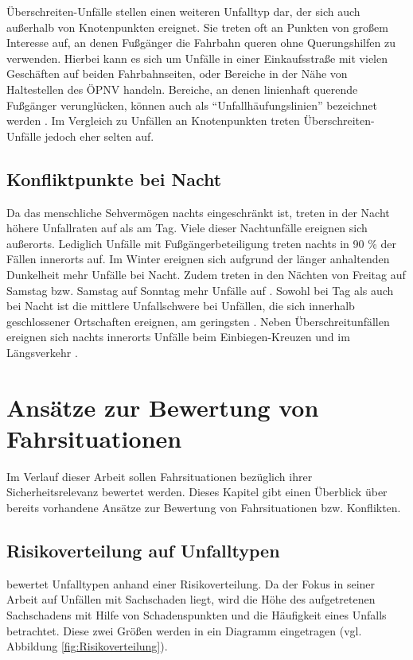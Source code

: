 Überschreiten-Unfälle stellen einen weiteren Unfalltyp dar, der sich auch außerhalb von Knotenpunkten ereignet. Sie treten oft an Punkten von großem Interesse auf, an denen Fußgänger die Fahrbahn queren ohne Querungshilfen zu verwenden. Hierbei kann es sich um Unfälle in einer Einkaufsstraße mit vielen Geschäften auf beiden Fahrbahnseiten, oder Bereiche in der Nähe von Haltestellen des \ac{ÖPNV} handeln. %
Bereiche, an denen linienhaft querende Fußgänger verunglücken, können auch als \enquote{Unfallhäufungslinien} bezeichnet werden \parencite[S. 18]{ForschungsgesellschaftfurStraenundVerkehrswesen.2012}. Im Vergleich zu Unfällen an Knotenpunkten treten Überschreiten-Unfälle jedoch eher selten auf.

\subsection{Konfliktpunkte bei Nacht}
Da das menschliche Sehvermögen nachts eingeschränkt ist, treten in der Nacht höhere Unfallraten auf als am Tag. Viele dieser Nachtunfälle ereignen sich außerorts. Lediglich Unfälle mit Fußgängerbeteiligung treten nachts in 90 \% der Fällen innerorts auf. Im Winter ereignen sich aufgrund der länger anhaltenden Dunkelheit mehr Unfälle bei Nacht. Zudem treten in den Nächten von Freitag auf Samstag bzw. Samstag auf Sonntag mehr Unfälle auf  \parencite[S. 12]{DEKRA.2017}. Sowohl bei Tag als auch bei Nacht ist die mittlere Unfallschwere bei Unfällen, die sich innerhalb geschlossener Ortschaften ereignen, am geringsten \parencite[S. 18]{DEKRA.2017}. Neben Überschreitunfällen ereignen sich nachts innerorts Unfälle beim Einbiegen-Kreuzen und im Längsverkehr \parencite[S. 26]{DEKRA.2017}.


\section{Ansätze zur Bewertung von Fahrsituationen}\label{section:Ansätze zur Bewertung von Fahrsituationen}
Im Verlauf dieser Arbeit sollen Fahrsituationen bezüglich ihrer Sicherheitsrelevanz bewertet werden. Dieses Kapitel gibt einen Überblick über bereits vorhandene Ansätze zur Bewertung von Fahrsituationen bzw. Konflikten. %

\subsection{Risikoverteilung auf Unfalltypen}\label{subsection:Risikoverteilung auf Unfalltypen}
\Textcite[S. 60]{Gschwendtner.2015} bewertet Unfalltypen anhand einer Risikoverteilung. Da der Fokus in seiner Arbeit auf Unfällen mit Sachschaden liegt, wird die Höhe des aufgetretenen Sachschadens mit Hilfe von Schadenspunkten und die Häufigkeit eines Unfalls betrachtet. Diese zwei Größen werden in ein Diagramm eingetragen (vgl. Abbildung \ref{fig:Risikoverteilung}).

